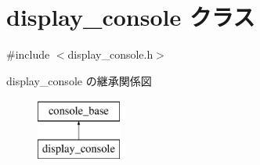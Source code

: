 \hypertarget{classdisplay__console}{}\section{display\+\_\+console クラス}
\label{classdisplay__console}


{\ttfamily \#include $<$display\+\_\+console.\+h$>$}

display\+\_\+console の継承関係図\begin{figure}[H]
\begin{center}
\leavevmode
\includegraphics[height=2.000000cm]{classdisplay__console}
\end{center}
\end{figure}
